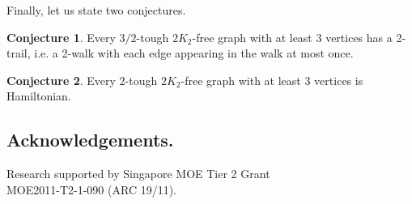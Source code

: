 \documentclass{amsart}
\theoremstyle{definition}
\newtheorem{conjecture}{Conjecture}
\begin{document}
Finally, let us state two conjectures.
\begin{conjecture}
Every $3/2$-tough $2K_2$-free graph with at least 3 vertices has a 2-trail, i.e. a 2-walk with each edge appearing in the walk at most once.
\end{conjecture}


\begin{conjecture}
Every 2-tough $2K_2$-free graph with at least 3 vertices is Hamiltonian.
\end{conjecture}

\subsection*{Acknowledgements.}
Research supported by Singapore MOE Tier 2 Grant \\ MOE2011-T2-1-090 (ARC 19/11).



%
\end{document}
